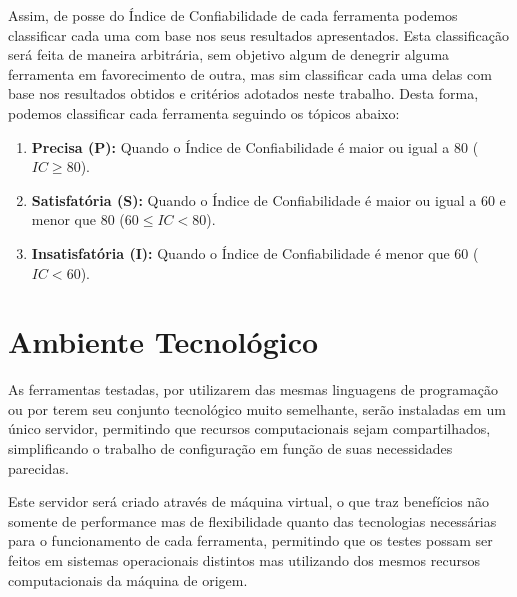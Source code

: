 Assim, de posse do Índice de Confiabilidade de cada ferramenta podemos classificar cada uma com base nos seus resultados apresentados. Esta classificação será feita de maneira arbitrária, sem objetivo algum de denegrir alguma ferramenta em favorecimento de outra, mas sim classificar cada uma delas com base nos resultados obtidos e critérios adotados neste trabalho. Desta forma, podemos classificar cada ferramenta seguindo os tópicos abaixo:

\begin{enumerate}
    \item \textbf{Precisa (P):} Quando o Índice de Confiabilidade é maior ou igual a 80 ($IC\geq80$).
    \item \textbf{Satisfatória (S):} Quando o Índice de Confiabilidade é maior ou igual a 60 e menor que 80 ($60 \leq IC < 80$).
    \item \textbf{Insatisfatória (I):} Quando o Índice de Confiabilidade é menor que 60 ($IC < 60$).
\end{enumerate}

\section{Ambiente Tecnológico}
\label{sec:tech-environment}

As ferramentas testadas, por utilizarem das mesmas linguagens de programação ou por terem seu conjunto tecnológico muito semelhante, serão instaladas em um único servidor, permitindo que recursos computacionais sejam compartilhados, simplificando o trabalho de configuração em função de suas necessidades parecidas.

Este servidor será criado através de máquina virtual, o que traz benefícios não somente de performance mas de flexibilidade quanto das tecnologias necessárias para o funcionamento de cada ferramenta, permitindo que os testes possam ser feitos em sistemas operacionais distintos mas utilizando dos mesmos recursos computacionais da máquina de origem.


